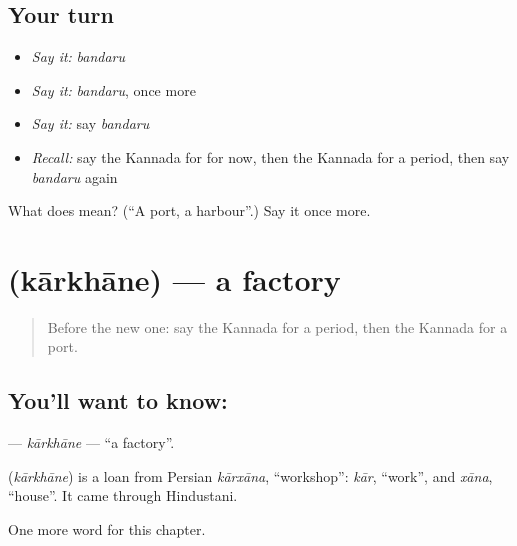 \subsection*{Your turn}
\begin{itemize}
\raggedright
  \item \emph{Say it:} \emph{bandaru}
  \item \emph{Say it:} \emph{bandaru}, once more
  \item \emph{Say it:} say \emph{bandaru}
  \item \emph{Recall:} say the Kannada for for now, then the Kannada for a period, then say \emph{bandaru} again
\end{itemize}

\begin{tcolorbox}[breakable,colback=teal!4,colframe=teal!35!black,title={Before you move on}]
What does  mean? (\textquotedblleft{}A port, a harbour\textquotedblright{}.) Say it once more.
\end{tcolorbox}
\section[\texorpdfstring{\kn{ಕಾರ್ಖಾನೆ} (kārkhāne)}{ಕಾರ್ಖಾನೆ (kārkhāne)}]{ (kārkhāne) — a factory}

\label{lesson:KA-C212-karkhane}



\begin{quote}
Before the new one: say the Kannada for a period, then the Kannada for a port.
\end{quote}

\subsection*{You'll want to know: }
\textbf{} — \emph{kārkhāne} — \textquotedblleft{}a factory\textquotedblright{}.

\begin{cousinweb}
\textbf{} (\emph{kārkhāne}) is a loan from Persian \emph{kārxāna}, \textquotedblleft{}workshop\textquotedblright{}: \emph{kār}, \textquotedblleft{}work\textquotedblright{}, and \emph{xāna}, \textquotedblleft{}house\textquotedblright{}. It came through Hindustani.
\end{cousinweb}

\begin{grammarlens}[title={What you've built}]
One more word for this chapter.
\end{grammarlens}

